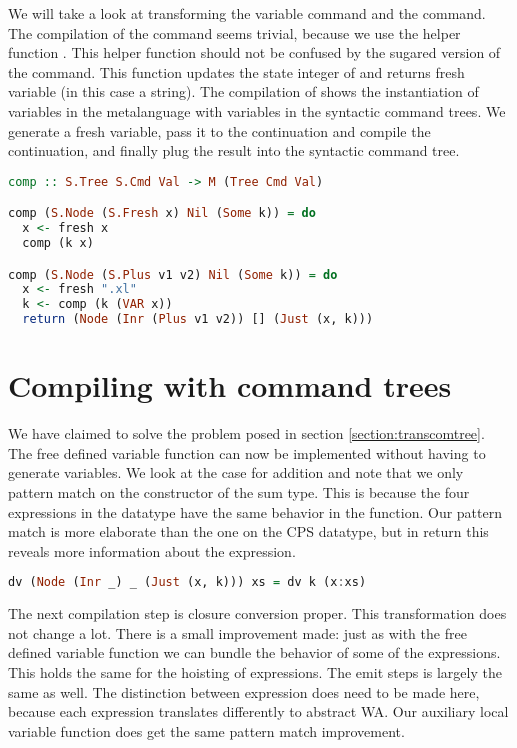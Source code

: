 We will take a look at transforming the  variable command and the  command. The compilation of the  command seems trivial, because we use the helper function . This helper function should not be confused by the sugared version of the  command. This function updates the state integer of  and returns fresh variable (in this case a string). The compilation of  shows the instantiation of variables in the metalanguage with variables in the syntactic command trees. We generate a fresh variable, pass it to the continuation and compile the continuation, and finally plug the result into the syntactic command tree.

\begin{lstlisting}[language=Haskell]
comp :: S.Tree S.Cmd Val -> M (Tree Cmd Val)

comp (S.Node (S.Fresh x) Nil (Some k)) = do
  x <- fresh x
  comp (k x)

comp (S.Node (S.Plus v1 v2) Nil (Some k)) = do
  x <- fresh ".xl"
  k <- comp (k (VAR x))
  return (Node (Inr (Plus v1 v2)) [] (Just (x, k)))
\end{lstlisting}


\section{\label{section:compcomtree}Compiling with command trees}
We have claimed to solve the problem posed in section \ref{section:transcomtree}. The free defined variable function  can now be implemented without having to generate variables. We look at the case for addition and note that we only pattern match on the constructor of the sum type. This is because the four expressions in the  datatype have the same behavior in the  function. Our pattern match is more elaborate than the one on the \ac{CPS} datatype, but in return this reveals more information about the expression.

\begin{lstlisting}[language=Haskell]
dv (Node (Inr _) _ (Just (x, k))) xs = dv k (x:xs)
\end{lstlisting}

The next compilation step is closure conversion proper. This transformation does not change a lot. There is a small improvement made: just as with the free defined variable function we can bundle the behavior of some of the  expressions. This holds the same for the hoisting of  expressions. The emit steps is largely the same as well. The distinction between  expression does need to be made here, because each expression translates differently to abstract \ac{WA}. Our auxiliary local variable function does get the same pattern match improvement.

